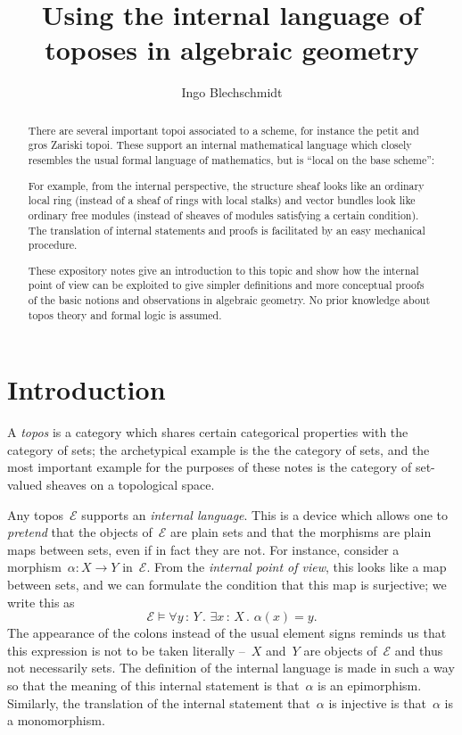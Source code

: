 \documentclass[10pt]{amsart}
\title{Using the internal language of toposes in algebraic geometry}
\author{Ingo Blechschmidt}
\theoremstyle{definition}
\theoremstyle{plain}
\theoremstyle{remark}
\newcommand{\E}{\mathcal{E}}
\newcommand{\?}{\,{:}\,}
\renewcommand{\_}{\mathpunct{.}\,}
\begin{document}
\begin{abstract}
  There are several important topoi associated to a scheme, for instance the
  petit and gros Zariski topoi. These support an internal mathematical language
  which closely resembles the usual formal language of mathematics, but is ``local
  on the base scheme'':

  For example, from the internal perspective, the structure sheaf looks like an
  ordinary local ring (instead of a sheaf of rings with local stalks) and vector
  bundles look like ordinary free modules (instead of sheaves of modules
  satisfying a certain condition). The translation of internal statements and
  proofs is facilitated by an easy mechanical procedure.

  These expository notes give an introduction to this topic and show how the internal
  point of view can be exploited to give simpler definitions and more conceptual
  proofs of the basic notions and observations in algebraic geometry. No prior
  knowledge about topos theory and formal logic is assumed.
\end{abstract}

\maketitle

\setcounter{tocdepth}{1}
\tableofcontents

\section{Introduction}

A \emph{topos} is a category which shares certain categorical properties with
the category of sets; the archetypical example is the the category of sets, and
the most important example for the purposes of these notes is the category of
set-valued sheaves on a topological space.

Any topos~$\E$ supports an \emph{internal language}. This is a device which
allows one to \emph{pretend} that the objects of~$\E$ are plain sets and that
the morphisms are plain maps between sets, even if in fact they are not. For
instance, consider a morphism~$\alpha : X \to Y$ in~$\E$. From the \emph{internal
point of view}, this looks like a map between sets, and we can formulate the
condition that this map is surjective; we write this as
\[ \E \models \forall y\?Y\_ \exists x\?X\_ \alpha(x) = y. \]
The appearance of the colons instead of the usual element signs reminds us that
this expression is not to be taken literally --~$X$ and~$Y$ are objects of~$\E$
and thus not necessarily sets. The definition of the internal language is made
in such a way so that the meaning of this internal statement is that~$\alpha$
is an epimorphism. Similarly, the translation of the internal statement
that~$\alpha$ is injective is that~$\alpha$ is a monomorphism.
\end{document}
